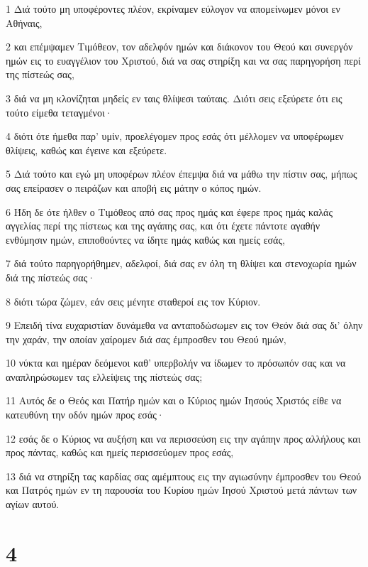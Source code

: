 \par 1 Διά τούτο μη υποφέροντες πλέον, εκρίναμεν εύλογον να απομείνωμεν μόνοι εν Αθήναις,
\par 2 και επέμψαμεν Τιμόθεον, τον αδελφόν ημών και διάκονον του Θεού και συνεργόν ημών εις το ευαγγέλιον του Χριστού, διά να σας στηρίξη και να σας παρηγορήση περί της πίστεώς σας,
\par 3 διά να μη κλονίζηται μηδείς εν ταις θλίψεσι ταύταις. Διότι σεις εξεύρετε ότι εις τούτο είμεθα τεταγμένοι·
\par 4 διότι ότε ήμεθα παρ' υμίν, προελέγομεν προς εσάς ότι μέλλομεν να υποφέρωμεν θλίψεις, καθώς και έγεινε και εξεύρετε.
\par 5 Διά τούτο και εγώ μη υποφέρων πλέον έπεμψα διά να μάθω την πίστιν σας, μήπως σας επείρασεν ο πειράζων και αποβή εις μάτην ο κόπος ημών.
\par 6 Ήδη δε ότε ήλθεν ο Τιμόθεος από σας προς ημάς και έφερε προς ημάς καλάς αγγελίας περί της πίστεως και της αγάπης σας, και ότι έχετε πάντοτε αγαθήν ενθύμησιν ημών, επιποθούντες να ίδητε ημάς καθώς και ημείς εσάς,
\par 7 διά τούτο παρηγορήθημεν, αδελφοί, διά σας εν όλη τη θλίψει και στενοχωρία ημών διά της πίστεώς σας·
\par 8 διότι τώρα ζώμεν, εάν σεις μένητε σταθεροί εις τον Κύριον.
\par 9 Επειδή τίνα ευχαριστίαν δυνάμεθα να ανταποδώσωμεν εις τον Θεόν διά σας δι' όλην την χαράν, την οποίαν χαίρομεν διά σας έμπροσθεν του Θεού ημών,
\par 10 νύκτα και ημέραν δεόμενοι καθ' υπερβολήν να ίδωμεν το πρόσωπόν σας και να αναπληρώσωμεν τας ελλείψεις της πίστεώς σας;
\par 11 Αυτός δε ο Θεός και Πατήρ ημών και ο Κύριος ημών Ιησούς Χριστός είθε να κατευθύνη την οδόν ημών προς εσάς·
\par 12 εσάς δε ο Κύριος να αυξήση και να περισσεύση εις την αγάπην προς αλλήλους και προς πάντας, καθώς και ημείς περισσεύομεν προς εσάς,
\par 13 διά να στηρίξη τας καρδίας σας αμέμπτους εις την αγιωσύνην έμπροσθεν του Θεού και Πατρός ημών εν τη παρουσία του Κυρίου ημών Ιησού Χριστού μετά πάντων των αγίων αυτού.

\chapter{4}

